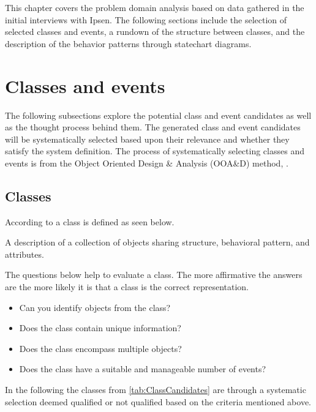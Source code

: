 This chapter covers the problem domain analysis based on data gathered in the initial interviews with Ipsen.
The following sections include the selection of selected classes and events, a rundown of the structure between classes, and the description of the behavior patterns through statechart diagrams.

\section{Classes and events}\label{sec:ClassEvent}
The following subsections explore the potential class and event candidates as well as the thought process behind them.
The generated class and event candidates will be systematically selected based upon their relevance and whether they satisfy the system definition.
The process of systematically selecting classes and events is from the Object Oriented Design \& Analysis (OOA\&D) method, \cite{Rod-Aalborg}.

\subsection{Classes} \label{sec:Classes}
According to  \citep[p.~55]{Rod-Aalborg} a class is defined as seen below.
\begin{defn}\label{defn:class}
	A description of a collection of objects sharing structure, behavioral pattern, and attributes.
\end{defn}

The questions below help to evaluate a class. The more affirmative the answers are the more likely it is that a class is the correct representation. \citep[p.~62]{Rod-Aalborg}
\begin{itemize}
	\item Can you identify objects from the class?
	\item Does the class contain unique information?
	\item Does the class encompass multiple objects?
	\item Does the class have a suitable and manageable number of events?
\end{itemize}

In the following the classes from \cref{tab:ClassCandidates} are through a systematic selection deemed qualified or not qualified based on the criteria mentioned above.


